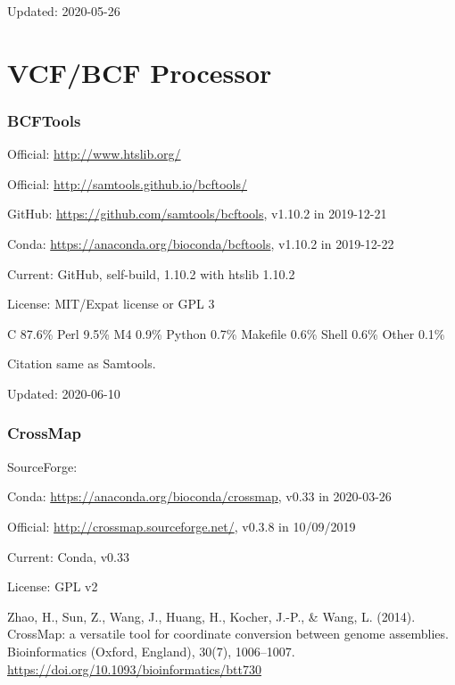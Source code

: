 \documentclass[]{article}
\begin{document}
Updated: 2020-05-26

\part{VCF/BCF Processor}

\section{BCFTools}

Official: \url{http://www.htslib.org/}

Official: \url{http://samtools.github.io/bcftools/}

GitHub: \url{https://github.com/samtools/bcftools}, v1.10.2 in 2019-12-21

Conda: \url{https://anaconda.org/bioconda/bcftools}, v1.10.2 in 2019-12-22

Current: GitHub, self-build, 1.10.2 with htslib 1.10.2

License: MIT/Expat license or GPL 3

C 87.6\% Perl 9.5\% M4 0.9\% Python 0.7\% Makefile 0.6\% Shell 0.6\% Other 0.1\%

Citation same as Samtools.

Updated: 2020-06-10

\section{CrossMap}

SourceForge: 

Conda: \url{https://anaconda.org/bioconda/crossmap}, v0.33 in 2020-03-26

Official: \url{http://crossmap.sourceforge.net/}, v0.3.8 in 10/09/2019

Current: Conda, v0.33

License: GPL v2

Zhao, H., Sun, Z., Wang, J., Huang, H., Kocher, J.-P., \& Wang, L. (2014). CrossMap: a versatile tool for coordinate conversion between genome assemblies. Bioinformatics (Oxford, England), 30(7), 1006–1007. \url{https://doi.org/10.1093/bioinformatics/btt730}
\end{document}
